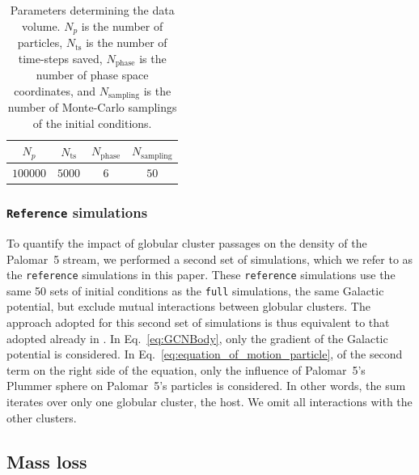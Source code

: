             \begin{center}
                \begin{table}[h]
                    \centering
                    \caption{Parameters determining the data volume. $N_p$  is the number of particles, $N_{\mathrm{ts}}$ is the number of time-steps saved, $N_{\mathrm{phase}}$ is the number of phase space coordinates, and $N_{\mathrm{sampling}}$ is the number of Monte-Carlo samplings of the initial conditions.}
                    \label{tab:data_volume}
                    \begin{tabular}{|c|c|c|c|}
                        \hline
                        $N_p$ & $N_{\mathrm{ts}}$ & $N_{\mathrm{phase}}$ & $N_{\mathrm{sampling}}$ \\
                        \hline
                        $100000$ & $5000$ & $6$ & $50$ \\
                        \hline
                    \end{tabular}
                \end{table}
            \end{center}

        \subsubsection{ \texttt{Reference} simulations}
        To quantify the impact of globular cluster passages on the density of the Palomar~5 stream, we performed a second set of simulations, which we refer to as the \texttt{reference} simulations in this paper.  These \texttt{reference} simulations use the same 50 sets of initial conditions as the \texttt{full} simulations, the same Galactic potential, but exclude mutual interactions between globular clusters. The approach adopted for this second set of simulations is thus equivalent to that adopted already in \citet{2023A&A...673A..44F}. In Eq.~\ref{eq:GCNBody}, only the gradient of the Galactic potential is considered. In Eq.~\ref{eq:equation_of_motion_particle}, of the second term on the right side of the equation, only the influence of Palomar~5's Plummer sphere on Palomar~5's particles is considered. In other words, the sum iterates over only one globular cluster, the host. We omit all interactions with the other clusters.
    \subsection{Mass loss}\label{sec:mass_loss}

